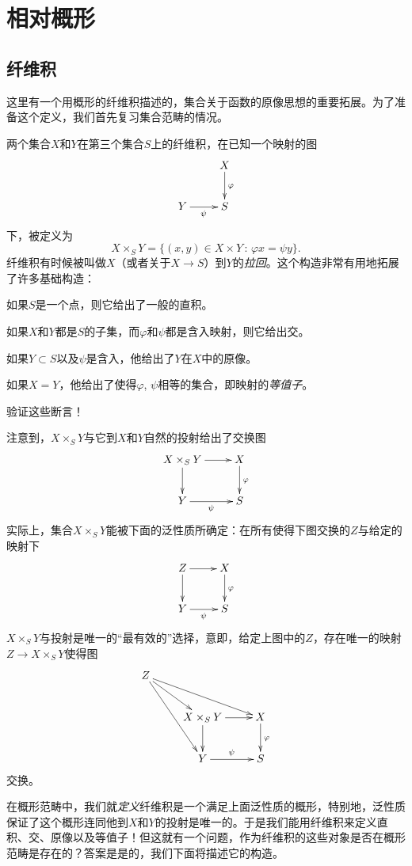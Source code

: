 \section{相对概形}
\subsection{纤维积} \label{s:1.3.1}

这里有一个用概形的纤维积描述的，集合关于函数的原像思想的重要拓展。为了准备这个定义，我们首先复习集合范畴的情况。

两个集合$X$和$Y$在第三个集合$S$上的纤维积，在已知一个映射的图
\[
	\xymatrix{
	&X\ar[d]^\varphi\\
	Y\ar[r]_\psi &S
	}
\]
下，被定义为
\[
	X\times_S Y=\{(x,y)\in X\times Y\,:\,\varphi x=\psi y\}.
\]
纤维积有时候被叫做$X$（或者关于$X\to S$）到$Y$的\textit{拉回}。这个构造非常有用地拓展了许多基础构造：

如果$S$是一个点，则它给出了一般的直积。

如果$X$和$Y$都是$S$的子集，而$\varphi$和$\psi$都是含入映射，则它给出交。

如果$Y\subset S$以及$\psi$是含入，他给出了$Y$在$X$中的原像。

如果$X=Y$，他给出了使得$\varphi$, $\psi$相等的集合，即映射的\textit{等值子}。

\begin{exe}
	验证这些断言！
\end{exe}

注意到，$X\times_S Y$与它到$X$和$Y$自然的投射给出了交换图
\[
	\xymatrix{
	X\times_S Y\ar[r]\ar[d]&X\ar[d]^\varphi\\
	Y\ar[r]_\psi &S
	}
\]
实际上，集合$X\times_S Y$能被下面的泛性质所确定：在所有使得下图交换的$Z$与给定的映射下
\[
	\xymatrix{
	Z\ar[r]\ar[d]&X\ar[d]^\varphi\\
	Y\ar[r]_\psi &S
	}
\]
$X\times_S Y$与投射是唯一的“最有效的”选择，意即，给定上图中的$Z$，存在唯一的映射$Z\to X\times_S Y$使得图
\[
	\xymatrix{
	Z\ar[dr]\ar[ddr]\ar[drr] & &\\
	& X\times_S Y \ar[r]\ar[d] &  X \ar[d]^\varphi\\
	& Y\ar[r]^\psi &  S
	}
\]
交换。

在概形范畴中，我们就\textit{定义}纤维积是一个满足上面泛性质的概形，特别地，泛性质保证了这个概形连同他到$X$和$Y$的投射是唯一的。于是我们能用纤维积来定义直积、交、原像以及等值子！但这就有一个问题，作为纤维积的这些对象是否在概形范畴是存在的？答案是是的，我们下面将描述它的构造。

